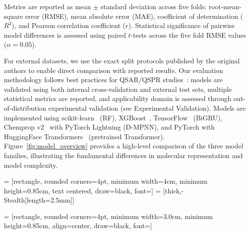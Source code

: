 \documentclass[journal=jcisd8,manuscript=article]{achemso}
\begin{document}
Metrics are reported as mean $\pm$ standard deviation across five folds: root-mean-square error (RMSE), mean absolute error (MAE), coefficient of determination ($R^2$), and Pearson correlation coefficient ($r$).
Statistical significance of pairwise model differences is assessed using paired $t$-tests across the five fold RMSE values ($\alpha = 0.05$).

For external datasets, we use the exact split protocols published by the original authors to enable direct comparison with reported results.
Our evaluation methodology follows best practices for QSAR/QSPR studies~\cite{tropsha2006best, cherkasov2014qsar}: models are validated using both internal cross-validation and external test sets, multiple statistical metrics are reported, and applicability domain is assessed through out-of-distribution experimental validation (see Experimental Validation).
Models are implemented using scikit-learn~\cite{pedregosa2011scikit} (RF), XGBoost~\cite{chen2016xgboost}, TensorFlow~\cite{abadi2016tensorflow} (BiGRU), Chemprop v2~\cite{yangAnalyzingLearnedMolecular2019} with PyTorch Lightning (D-MPNN), and PyTorch with HuggingFace Transformers~\cite{chithrananda2020chemberta} (pretrained Transformer).
Figure~\ref{fig:model_overview} provides a high-level comparison of the three model families, illustrating the fundamental differences in molecular representation and model complexity.


 = [rectangle, rounded corners=4pt, minimum width=4cm, minimum height=0.85cm, text centered, draw=black, font=\small]
 = [thick,-{Stealth[length=2.5mm]}]

 = [rectangle, rounded corners=4pt, minimum width=3.0cm, minimum height=0.85cm, align=center, draw=black, font=\small]
\end{document}
